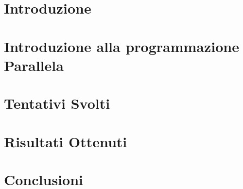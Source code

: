 \documentclass[12pt,a4paper]{report}
\begin{document}
\chapter{Introduzione}

\chapter{Introduzione alla programmazione Parallela}

\chapter{Tentativi Svolti}


\chapter{Risultati Ottenuti}

\chapter{Conclusioni}
\end{document}
